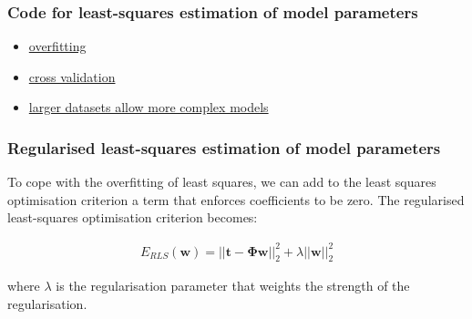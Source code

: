 \documentclass{beamer}
\begin{document}
\begin{frame}
    \frametitle{Code for least-squares estimation of model parameters}
    \begin{itemize}
        \item \href{https://joacorapela.github.io/gcnuBridging2023/auto\_examples/bayesianLinearRegression/plotOverfittingLeastSquares.html\#sphx-glr-auto-examples-bayesianlinearregression-plotoverfittingleastsquares-py}{overfitting}
        \item \href{https://joacorapela.github.io/gcnuBridging2023/auto\_examples/bayesianLinearRegression/plotCrossValidationLeastSquares.html\#sphx-glr-auto-examples-bayesianlinearregression-plotcrossvalidationleastsquares-py}{cross validation}
        \item \href{https://joacorapela.github.io/gcnuBridging2023/auto\_examples/bayesianLinearRegression/plotLackOfOverfittingInLeastSquaresForLargerDatasetSize.html\#sphx-glr-auto-examples-bayesianlinearregression-plotlackofoverfittinginleastsquaresforlargerdatasetsize-py}{larger datasets allow more complex models}
    \end{itemize}
\end{frame}

\begin{frame}
    \frametitle{Regularised least-squares estimation of model parameters}

    To cope with the overfitting of least squares, we can add to the least
    squares optimisation criterion a term that enforces coefficients to be
    zero. The regularised least-squares optimisation criterion becomes:

    \begin{align*}
        E_{RLS}(\mathbf{w})=||\mathbf{t}-\boldsymbol{\Phi}\mathbf{w}||_2^2+\lambda||\mathbf{w}||_2^2
    \end{align*}

    where $\lambda$ is the regularisation parameter that weights the strength
    of the regularisation.
\end{frame}
\end{document}
